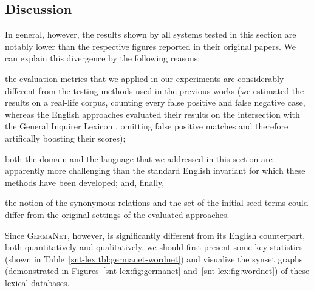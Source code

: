 \subsection{Discussion}

In general, however, the results shown by all systems tested in this
section are notably lower than the respective figures reported in
their original papers.  We can explain this divergence by the
following reasons:
\begin{inparaenum}
\item the evaluation metrics that we applied in our experiments are
  considerably different from the testing methods used in the previous
  works (we estimated the results on a real-life corpus, counting
  every false positive and false negative case, whereas the English
  approaches evaluated their results on the intersection with the
  General Inquirer Lexicon \cite{Stone:66}, omitting false positive
  matches and therefore artifically boosting their scores);
\item both the domain and the language that we addressed in this
  section are apparently more challenging than the standard English
  invariant for which these methods have been developed; and, finally,
\item the notion of the synonymous relations and the set of the
  initial seed terms could differ from the original settings of the
  evaluated approaches.
\end{inparaenum}


Since \textsc{GermaNet}, however, is significantly different from its
English counterpart, both quantitatively and qualitatively, we should
first present some key statistics (shown in
Table~\ref{snt-lex:tbl:germanet-wordnet}) and visualize the synset
graphs (demonstrated in Figures~\ref{snt-lex:fig:germanet}
and~\ref{snt-lex:fig:wordnet}) of these lexical databases.

